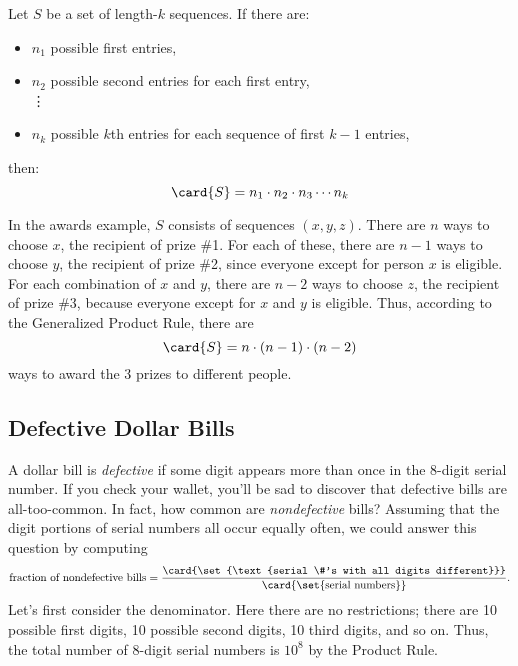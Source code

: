 \begin{rul}
Let $S$ be a set of length-$k$ sequences.  If there are:
%
\begin{itemize}
\item $n_1$ possible first entries,
\item $n_2$ possible second entries for each first entry,\\
\iffalse
\item $n_3$ possible third entries for each sequence of first and
second entries,\\
\fi
\vdots
\item $n_k$ possible $k$th entries for each sequence of first $k-1$
  entries,
\end{itemize}
%
then:
%
\[
\card{S} = n_1 \cdot n_2 \cdot n_3 \cdots n_k
\]
\end{rul}

In the awards example, $S$ consists of sequences $(x, y, z)$.  There
are $n$ ways to choose $x$, the recipient of prize \#1.  For each of
these, there are $n-1$ ways to choose $y$, the recipient of prize \#2,
since everyone except for person $x$ is eligible.  For each
combination of $x$ and $y$, there are $n-2$ ways to choose $z$, the
recipient of prize \#3, because everyone except for $x$ and $y$ is
eligible.  Thus, according to the Generalized Product Rule, there are
%
\[
\card{S} = n \cdot (n-1) \cdot (n-2)
\]
%
ways to award the 3 prizes to different people.

\subsection{Defective Dollar Bills}

A dollar bill is \emph{defective} if some digit appears
more than once in the 8-digit serial number.  If you check your
wallet, you'll be sad to discover that defective bills are
all-too-common.  In fact, how common are \emph{nondefective} bills?
Assuming that the digit portions of serial numbers all occur equally
often, we could answer this question by computing
%
\begin{equation}\label{eqn:11Q6}
\text{fraction of nondefective bills}
     = \frac{ \card{\set{\text{serial \#'s with all digits different}}} }
             { \card{\set{\text{serial numbers}}} }.
\end{equation}
%
Let's first consider the denominator.  Here there are no restrictions;
there are 10 possible first digits, 10 possible second digits, 10
third digits, and so on.  Thus, the total number of 8-digit serial
numbers is $10^8$ by the Product Rule.

